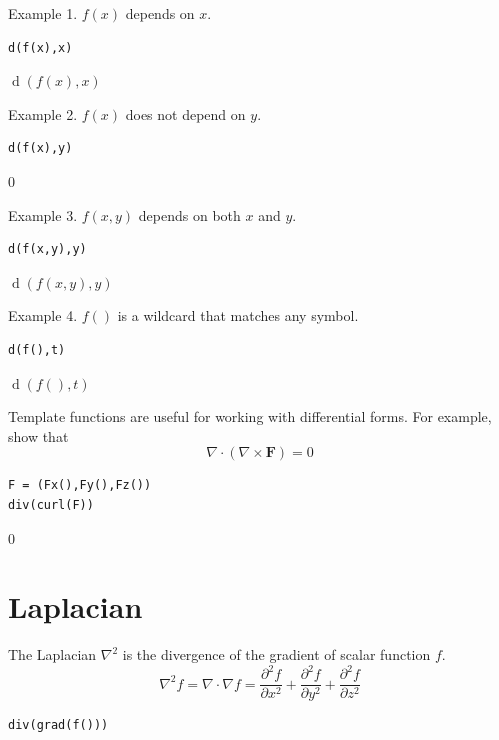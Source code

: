 \documentclass[12pt]{article}
\begin{document}
\bigskip
Example 1. $f(x)$ depends on $x$.

{\color{blue}
\begin{verbatim}
d(f(x),x)
\end{verbatim}}

$\operatorname{d}(f(x),x)$

\bigskip
Example 2. $f(x)$ does not depend on $y$.

{\color{blue}
\begin{verbatim}
d(f(x),y)
\end{verbatim}}

$0$

\bigskip
Example 3. $f(x,y)$ depends on both $x$ and $y$.

{\color{blue}
\begin{verbatim}
d(f(x,y),y)
\end{verbatim}}

$\operatorname{d}(f(x,y),y)$

\bigskip
Example 4. $f()$ is a wildcard that matches any symbol.

{\color{blue}
\begin{verbatim}
d(f(),t)
\end{verbatim}}

$\operatorname{d}(f(),t)$

\bigskip
Template functions are useful for working with differential forms.
For example, show that
\begin{equation*}
\nabla\cdot(\nabla\times\mathbf F)=0
\end{equation*}

{\color{blue}
\begin{verbatim}
F = (Fx(),Fy(),Fz())
div(curl(F))
\end{verbatim}}

$0$

\newpage

\section{Laplacian}

The Laplacian $\nabla^2$ is the divergence of the gradient of scalar function $f$.
\begin{equation*}
\nabla^2f=\nabla\cdot\nabla f
=\frac{\partial^2 f}{\partial x^2}
+\frac{\partial^2 f}{\partial y^2}
+\frac{\partial^2 f}{\partial z^2}
\end{equation*}

{\color{blue}
\begin{verbatim}
div(grad(f()))
\end{verbatim}}
\end{document}
